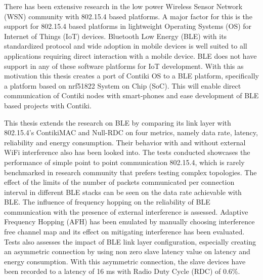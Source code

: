 There has been extensive research in the low power Wireless Sensor Network (WSN) community with 802.15.4 based platforms. A major factor for this is the support for 802.15.4 based platforms in lightweight Operating Systems (OS) for Internet of Things (IoT) devices. Bluetooth Low Energy (BLE) with its standardized protocol and wide adoption in mobile devices is well suited to all applications requiring direct interaction with a mobile device. BLE does not have support in any of these software platforms for IoT development. With this as motivation this thesis creates a port of Contiki OS to a BLE platform, specifically a platform based on nrf51822 System on Chip (SoC). This will enable direct communication of Contiki nodes with smart-phones and ease development of BLE based projects with Contiki.

This thesis extends the research on BLE by comparing its link layer with 802.15.4's ContikiMAC and Null-RDC on four metrics, namely data rate, latency, reliability and energy consumption. Their behavior with and without external WiFi interference also has been looked into. The tests conducted showcases the performance of simple point to point communication 802.15.4, which is rarely benchmarked in research community that prefers testing complex topologies. The effect of the limits of the number of packets communicated per connection interval in different BLE stacks can be seen on the data rate achievable with BLE. The influence of frequency hopping on the reliability of BLE communication with the presence of external interference is assessed. Adaptive Frequency Hopping (AFH) has been emulated by manually choosing interference free channel map and its effect on mitigating interference has been evaluated. Tests also assesses the impact of BLE link layer configuration, especially creating an asymmetric connection by using non zero slave latency value on latency and energy consumption. With this asymmetric connection, the slave devices have been recorded to a latency of 16 ms with Radio Duty Cycle (RDC) of 0.6\%. %




